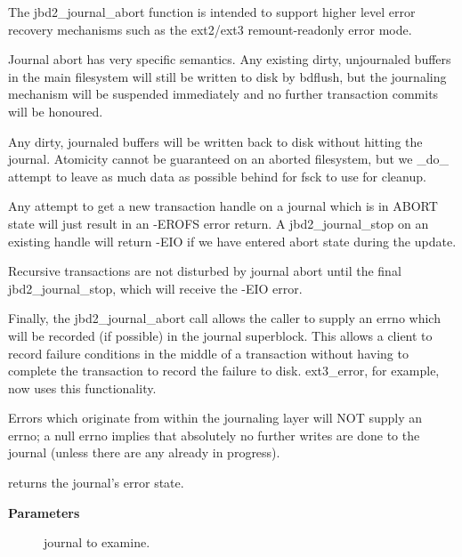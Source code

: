 \documentclass[a4paper,8pt,english]{sphinxmanual}
\begin{document}
The jbd2\_journal\_abort function is intended to support higher level error
recovery mechanisms such as the ext2/ext3 remount-readonly error
mode.

Journal abort has very specific semantics.  Any existing dirty,
unjournaled buffers in the main filesystem will still be written to
disk by bdflush, but the journaling mechanism will be suspended
immediately and no further transaction commits will be honoured.

Any dirty, journaled buffers will be written back to disk without
hitting the journal.  Atomicity cannot be guaranteed on an aborted
filesystem, but we \_do\_ attempt to leave as much data as possible
behind for fsck to use for cleanup.

Any attempt to get a new transaction handle on a journal which is in
ABORT state will just result in an -EROFS error return.  A
jbd2\_journal\_stop on an existing handle will return -EIO if we have
entered abort state during the update.

Recursive transactions are not disturbed by journal abort until the
final jbd2\_journal\_stop, which will receive the -EIO error.

Finally, the jbd2\_journal\_abort call allows the caller to supply an errno
which will be recorded (if possible) in the journal superblock.  This
allows a client to record failure conditions in the middle of a
transaction without having to complete the transaction to record the
failure to disk.  ext3\_error, for example, now uses this
functionality.

Errors which originate from within the journaling layer will NOT
supply an errno; a null errno implies that absolutely no further
writes are done to the journal (unless there are any already in
progress).

\begin{fulllineitems}
\label{filesystems/index:c.jbd2_journal_errno}
returns the journal's error state.

\end{fulllineitems}


\textbf{Parameters}
\begin{description}
\item[{}] \leavevmode
journal to examine.

\end{description}
\end{document}
